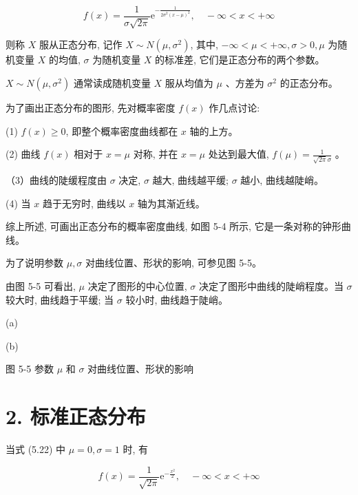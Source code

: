 \documentclass[10pt]{article}
\begin{document}
\begin{CJK*}{UTF8}{bsmi}
\begin{equation*}
f(x)=\frac{1}{\sigma \sqrt{2 \pi}} \mathrm{e}^{-\frac{1}{2 \sigma^{2}(x-\mu)^{2}}}, \quad-\infty<x<+\infty \tag{5.22}
\end{equation*}


则称 $X$ 服从正态分布, 记作 $X \sim N\left(\mu, \sigma^{2}\right)$, 其中, $-\infty<\mu<+\infty, \sigma>0, \mu$ 为随机变量 $X$ 的均值, $\sigma$ 为随机变量 $X$ 的标准差, 它们是正态分布的两个参数。

$X \sim N\left(\mu, \sigma^{2}\right)$ 通常读成随机变量 $X$ 服从均值为 $\mu$ 、方差为 $\sigma^{2}$ 的正态分布。

为了画出正态分布的图形, 先对概率密度 $f(x)$ 作几点讨论:

(1) $f(x) \geqslant 0$, 即整个概率密度曲线都在 $x$ 轴的上方。

(2) 曲线 $f(x)$ 相对于 $x=\mu$ 对称, 并在 $x=\mu$ 处达到最大值, $f(\mu)=\frac{1}{\sqrt{2 \pi} \sigma}$ 。

（3）曲线的陡缓程度由 $\sigma$ 决定, $\sigma$ 越大, 曲线越平缓; $\sigma$ 越小, 曲线越陡峭。

(4) 当 $x$ 趋于无穷时, 曲线以 $x$ 轴为其渐近线。

综上所述, 可画出正态分布的概率密度曲线, 如图 5-4 所示, 它是一条对称的钟形曲线。

为了说明参数 $\mu, \sigma$ 对曲线位置、形状的影响, 可参见图 5-5。

由图 5-5 可看出, $\mu$ 决定了图形的中心位置, $\sigma$ 决定了图形中曲线的陡峭程度。当 $\sigma$较大时, 曲线趋于平缓; 当 $\sigma$ 较小时, 曲线趋于陡峭。

\begin{center}
\end{center}

(a)

\begin{center}
\end{center}

(b)

图 5-5 参数 $\mu$ 和 $\sigma$ 对曲线位置、形状的影响

\section*{2. 标准正态分布}
当式 (5.22) 中 $\mu=0, \sigma=1$ 时, 有


\begin{equation*}
f(x)=\frac{1}{\sqrt{2 \pi}} \mathrm{e}^{-\frac{x^{2}}{2}}, \quad-\infty<x<+\infty \tag{5.23}
\end{equation*}



\end{CJK*}
\end{document}
